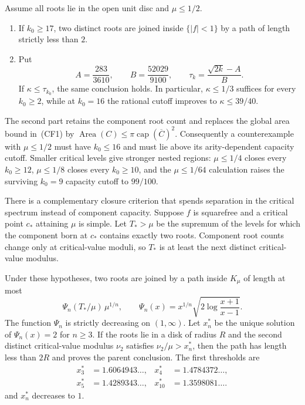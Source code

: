 \documentclass[11pt]{article}
\begin{document}
\begin{theorem}
\label{res:first-merge-capacity-closures}
Assume all roots lie in the open unit disc and $\mu\le1/2$.

\begin{enumerate}[label=\textup{(\roman*)},leftmargin=*]
\item If $k_0\ge17$, two distinct roots are joined inside $\{|f|<1\}$ by a
path of length strictly less than $2$.
\item Put
\[
 A=\frac{283}{3610},\qquad B=\frac{52029}{9100},\qquad
 \tau_k=\frac{\sqrt{2k}-A}{B}.
\]
If $\kappa\le\tau_{k_0}$, the same conclusion holds.  In particular,
$\kappa\le1/3$ suffices for every $k_0\ge2$, while at $k_0=16$ the rational
cutoff improves to $\kappa\le39/40$.
\end{enumerate}
\end{theorem}

The second part retains the component root count and replaces the global area
bound in~(CF1) by
$\operatorname{Area}(C)\le\pi\operatorname{cap}(\overline C)^2$.
Consequently a counterexample with $\mu\le1/2$ must have $k_0\le16$ and must
lie above its arity-dependent capacity cutoff.  Smaller critical levels give
stronger nested regions: $\mu\le1/4$ closes every $k_0\ge12$,
$\mu\le1/8$ closes every $k_0\ge10$, and the $\mu\le1/64$ calculation raises
the surviving $k_0=9$ capacity cutoff to $99/100$.

There is a complementary closure criterion that spends separation in the
critical spectrum instead of component capacity.  Suppose $f$ is squarefree
and a critical point $c_*$ attaining $\mu$ is simple.  Let $T_*>\mu$ be the
supremum of the levels for which the component born at $c_*$ contains exactly
two roots.  Component root counts change only at critical-value moduli, so
$T_*$ is at least the next distinct critical-value modulus.

\begin{theorem}
\label{res:minimal-hub-window}
Under these hypotheses, two roots are joined by a path inside $K_\mu$ of
length at most
\[
 \Psi_n(T_*/\mu)\,\mu^{1/n},\qquad
 \Psi_n(x)=x^{1/n}
   \sqrt{2\log\frac{x+1}{x-1}}.                     \tag{SW}
\]
The function $\Psi_n$ is strictly decreasing on $(1,\infty)$.  Let
$x_n^*$ be the unique solution of $\Psi_n(x)=2$ for $n\ge3$.  If the roots
lie in a disk of radius $R$ and the second distinct critical-value modulus
$\nu_2$ satisfies $\nu_2/\mu>x_n^*$, then the path has length less than
$2R$ and proves the parent conclusion.  The first thresholds are
\[
 \begin{aligned}
 x_3^*&=1.6064943\ldots,&
 x_4^*&=1.4784372\ldots,\\
 x_5^*&=1.4289343\ldots,&
 x_{10}^*&=1.3598081\ldots .
 \end{aligned}
\]
and $x_n^*$ decreases to $1$.
\end{theorem}
\end{document}
